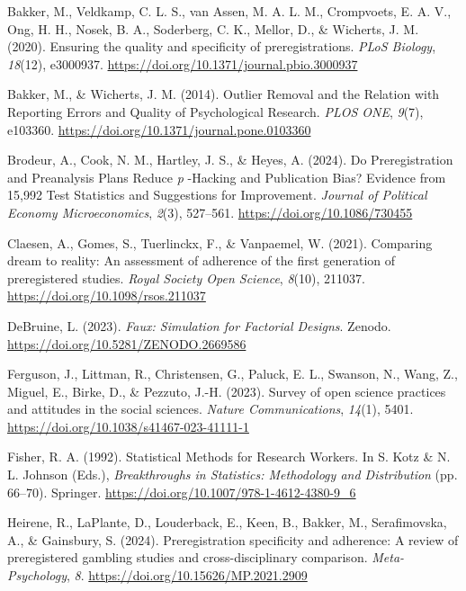 \documentclass[
  man,
  floatsintext,
  longtable,
  nolmodern,
  notxfonts,
  notimes,
  colorlinks=true,linkcolor=blue,citecolor=blue,urlcolor=blue]{apa7}
\newlength{\cslhangindent}
\newenvironment{CSLReferences}[2] %
 {\begin{list}{}{%
  \setlength{\itemindent}{0pt}
  \setlength{\leftmargin}{0pt}
  \setlength{\parsep}{0pt}
  \ifodd #1
   \setlength{\leftmargin}{\cslhangindent}
   \setlength{\itemindent}{-1\cslhangindent}
  \fi
  \setlength{\itemsep}{#2\baselineskip}}}
 {\end{list}}
\begin{document}
\label{refs}
\begin{CSLReferences}{1}{0}
Bakker, M., Veldkamp, C. L. S., van Assen, M. A. L. M., Crompvoets, E.
A. V., Ong, H. H., Nosek, B. A., Soderberg, C. K., Mellor, D., \&
Wicherts, J. M. (2020). Ensuring the quality and specificity of
preregistrations. \emph{PLoS Biology}, \emph{18}(12), e3000937.
\url{https://doi.org/10.1371/journal.pbio.3000937}

Bakker, M., \& Wicherts, J. M. (2014). Outlier {Removal} and the
{Relation} with {Reporting Errors} and {Quality} of {Psychological
Research}. \emph{PLOS ONE}, \emph{9}(7), e103360.
\url{https://doi.org/10.1371/journal.pone.0103360}

Brodeur, A., Cook, N. M., Hartley, J. S., \& Heyes, A. (2024). Do
{Preregistration} and {Preanalysis Plans Reduce} {\emph{p}} -{Hacking}
and {Publication Bias}? {Evidence} from 15,992 {Test Statistics} and
{Suggestions} for {Improvement}. \emph{Journal of Political Economy
Microeconomics}, \emph{2}(3), 527--561.
\url{https://doi.org/10.1086/730455}

Claesen, A., Gomes, S., Tuerlinckx, F., \& Vanpaemel, W. (2021).
Comparing dream to reality: An assessment of adherence of the first
generation of preregistered studies. \emph{Royal Society Open Science},
\emph{8}(10), 211037. \url{https://doi.org/10.1098/rsos.211037}

DeBruine, L. (2023). \emph{Faux: {Simulation} for {Factorial Designs}}.
Zenodo. \url{https://doi.org/10.5281/ZENODO.2669586}

Ferguson, J., Littman, R., Christensen, G., Paluck, E. L., Swanson, N.,
Wang, Z., Miguel, E., Birke, D., \& Pezzuto, J.-H. (2023). Survey of
open science practices and attitudes in the social sciences.
\emph{Nature Communications}, \emph{14}(1), 5401.
\url{https://doi.org/10.1038/s41467-023-41111-1}

Fisher, R. A. (1992). Statistical {Methods} for {Research Workers}. In
S. Kotz \& N. L. Johnson (Eds.), \emph{Breakthroughs in {Statistics}:
{Methodology} and {Distribution}} (pp. 66--70). Springer.
\url{https://doi.org/10.1007/978-1-4612-4380-9_6}

Heirene, R., LaPlante, D., Louderback, E., Keen, B., Bakker, M.,
Serafimovska, A., \& Gainsbury, S. (2024). Preregistration specificity
and adherence: {A} review of preregistered gambling studies and
cross-disciplinary comparison. \emph{Meta-Psychology}, \emph{8}.
\url{https://doi.org/10.15626/MP.2021.2909}


\end{CSLReferences}
\end{document}
